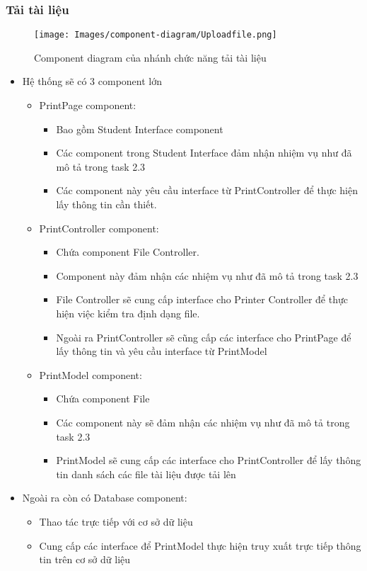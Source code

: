 \subsubsection{Tải tài liệu}
\begin{figure}[H]
    \centering
    \texttt{[image: Images/component-diagram/Uploadfile.png]}
    \newline
    \newline
    \caption{Component diagram của nhánh chức năng tải tài liệu}
    \label{fig:enter-label}
\end{figure}
\begin{itemize}
    \item Hệ thống sẽ có 3 component lớn
    \begin{itemize}
        \item PrintPage component:
        \begin{itemize}
            \item Bao gồm Student Interface component
            \item Các component trong Student Interface đảm nhận nhiệm vụ như đã mô tả trong task 2.3
            \item Các component này yêu cầu interface từ PrintController để thực hiện lấy thông tin cần thiết.
        \end{itemize}
        \item PrintController component:
        \begin{itemize}
            \item Chứa component File Controller.
            \item Component này đảm nhận các nhiệm vụ như đã mô tả trong task 2.3
            \item File Controller sẽ cung cấp interface cho Printer Controller để thực hiện việc kiểm tra định dạng file.
            \item Ngoài ra PrintController sẽ cũng cấp các interface cho PrintPage để lấy thông tin và yêu cầu interface từ PrintModel
        \end{itemize}
        \item PrintModel component:
        \begin{itemize}
            \item Chứa component File
            \item Các component này sẽ đảm nhận các nhiệm vụ như đã mô tả trong task 2.3
            \item PrintModel sẽ cung cấp các interface cho PrintController để lấy thông tin danh sách các file tài liệu được tải lên
        \end{itemize}
    \end{itemize}
    \item Ngoài ra còn có Database component:
        \begin{itemize}
            \item Thao tác trực tiếp với cơ sở dữ liệu
            \item Cung cấp các interface để PrintModel thực hiện truy xuất trực tiếp thông tin trên cơ sở dữ liệu
        \end{itemize}
    \end{itemize}
